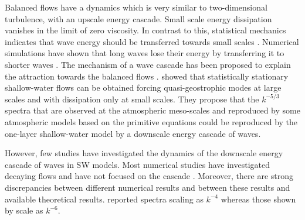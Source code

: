 \documentclass{jfm}
\begin{document}
Balanced flows have a dynamics which is very similar to
two-dimensional turbulence, with an upscale energy cascade. %
Small scale energy dissipation vanishes in the limit of zero
viscosity.
%
In contrast to this, statistical mechanics indicates that wave energy
should be transferred towards small scales \cite[]{Warn1986}.
Numerical simulations have shown that long waves lose their energy by
transferring it to shorter waves \cite[]{Sadourny1975,
FargeSadourny1989, YuanHamilton1994}.  The mechanism of a wave cascade
has been proposed to explain the attraction towards the balanced flows
\cite[]{Sadourny1975}.  \cite{YuanHamilton1994} showed that
statistically stationary shallow-water flows can be obtained forcing
quasi-geostrophic modes at large scales and with dissipation only at
small scales.
%
They propose that the $k^{-5/3}$ spectra that are observed at the
atmospheric meso-scales  \cite[]{NastromGage1985,LiLindborg2018}
and reproduced by some atmospheric models based on the primitive
equations \cite[]{KoshykHamilton2001, Skamarock2004,
Hamilton_etal2008} could be reproduced by the one-layer
shallow-water model by a downscale energy cascade of waves.



However, few studies have investigated the dynamics of the downscale
energy cascade of waves in SW models.
%
Most numerical studies have investigated decaying flows and have not
focused on the cascade \cite[]{FargeSadourny1989,
LarichevMcWilliams1991, SpallMcWilliams1992,
PolvaniMcWilliamsSpallFord1994, LahayeZeitlin2012}.
%
Moreover, there are strong discrepancies between different numerical
results and between these results and available theoretical results.
%
\cite{FargeSadourny1989} reported spectra scaling as $k^{-4}$
whereas those shown by \cite{LahayeZeitlin2012} scale as $k^{-6}$.
\end{document}
